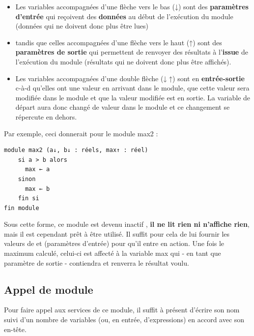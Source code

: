 \documentclass[11pt,a4paper]{article}
\begin{document}
            \par
        
					\begin{itemize}
				
			\item 
            Les variables accompagn\'ees d'une fl\`eche vers le bas (↓) sont des \textbf{param\`etres d'entr\'ee} qui
            re\c coivent des \textbf{donn\'ees} au d\'ebut de l'ex\'ecution du module (donn\'ees qui ne doivent donc plus
            \^etre lues) 
          
			\item 
            tandis que celles accompagn\'ees d'une fl\`eche vers le haut (↑) sont des \textbf{param\`etres
            de sortie} qui permettent de renvoyer des r\'esultats \`a l'\textbf{issue} de l'ex\'ecution du module
            (r\'esultats qui ne doivent donc plus \^etre affich\'es). 
          
			\item 
            Les variables accompagn\'ees d'une double fl\`eche (↓ ↑) sont en\textbf{ entr\'ee-sortie} c-\`a-d qu'elles ont une valeur
            en arrivant dans le module, que cette valeur sera modifi\'ee dans le module et que la valeur modifi\'ee est en sortie. 
            La variable de d\'epart aura donc chang\'e de valeur dans le module et ce changement se r\'epercute en dehors.
          
					\end{itemize}
				
            \par
        Par exemple, ceci donnerait pour le module max2 : 
            \par
        \begin{verbatim}
module max2 (a↓, b↓ : réels, max↑ : réel)
    si a > b alors
      max ← a
    sinon
      max ← b
    fin si
fin module
      \end{verbatim}
        Sous cette forme, ce module est devenu \guillemotleft  inactif \guillemotright , \textbf{il ne lit rien ni n'affiche rien},
        mais il est cependant pr\^et \`a \^etre utilis\'e. Il suffit pour cela de lui fournir les valeurs de \verb@a@ 
        et \verb@b@ (param\`etres d'entr\'ee) pour qu'il entre en action. Une fois le maximum calcul\'e, celui-ci est
        affect\'e \`a la variable max qui - en tant que param\`etre de sortie - contiendra et renverra le
        r\'esultat voulu.
      
            \par
        \subsection{Appel de module}
        Pour faire appel aux services de ce module, il suffit \`a pr\'esent d'\'ecrire son nom suivi d'un
        nombre de variables (ou, en entr\'ee, d'expressions) en accord avec son en-t\^ete. 
      
\end{document}
